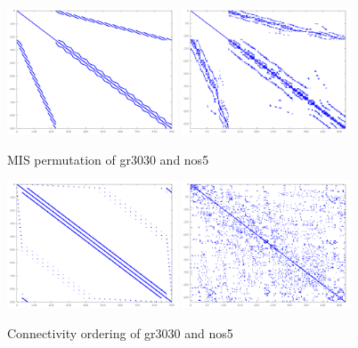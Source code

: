 \begin{figure}[!ht]
\centering
\includegraphics[width=0.45\textwidth]{./fig/perm/gr_30_30_mis.pdf}
\includegraphics[width=0.45\textwidth]{./fig/perm/nos5_mis.pdf}
\caption{MIS permutation of gr3030 and nos5}
\end{figure}

\begin{figure}[!ht]
\centering
\includegraphics[width=0.45\textwidth]{./fig/perm/gr_30_30_con.pdf}
\includegraphics[width=0.45\textwidth]{./fig/perm/nos5_con.pdf}
\caption{Connectivity ordering of gr3030 and nos5}
\end{figure}

